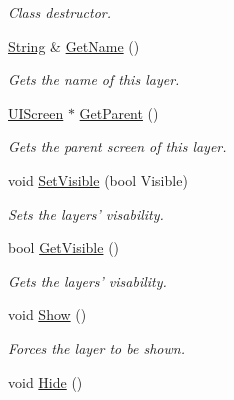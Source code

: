 \begin{DoxyCompactItemize}
\begin{DoxyCompactList}\small\item\em Class destructor. \item\end{DoxyCompactList}\item 
\hyperlink{namespacephys_aa03900411993de7fbfec4789bc1d392e}{String} \& \hyperlink{classphys_1_1UILayer_af69573dd43356fa8cf1672ac405f788e}{GetName} ()
\begin{DoxyCompactList}\small\item\em Gets the name of this layer. \item\end{DoxyCompactList}\item 
\hyperlink{classphys_1_1UIScreen}{UIScreen} $\ast$ \hyperlink{classphys_1_1UILayer_a1eeb2847ca5a3b71d8164c0dd1e1ec6c}{GetParent} ()
\begin{DoxyCompactList}\small\item\em Gets the parent screen of this layer. \item\end{DoxyCompactList}\item 
void \hyperlink{classphys_1_1UILayer_a466e35a0362e5f8f47c35e646075432c}{SetVisible} (bool Visible)
\begin{DoxyCompactList}\small\item\em Sets the layers' visability. \item\end{DoxyCompactList}\item 
bool \hyperlink{classphys_1_1UILayer_a2d4aaa7627339d7139d7a453ccf55ade}{GetVisible} ()
\begin{DoxyCompactList}\small\item\em Gets the layers' visability. \item\end{DoxyCompactList}\item 
\hypertarget{classphys_1_1UILayer_abb27a523942cd5502cadce7fd6c45870}{
void \hyperlink{classphys_1_1UILayer_abb27a523942cd5502cadce7fd6c45870}{Show} ()}
\label{da/d48/classphys_1_1UILayer_abb27a523942cd5502cadce7fd6c45870}

\begin{DoxyCompactList}\small\item\em Forces the layer to be shown. \item\end{DoxyCompactList}\item 
\hypertarget{classphys_1_1UILayer_a9ebf49907574502a39a5d08450b78af6}{
void \hyperlink{classphys_1_1UILayer_a9ebf49907574502a39a5d08450b78af6}{Hide} ()}
\label{da/d48/classphys_1_1UILayer_a9ebf49907574502a39a5d08450b78af6}


\end{DoxyCompactItemize}
